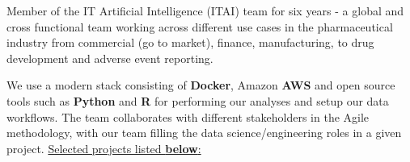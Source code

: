 
\vspace{2mm}

\begin{cvparagraph}

Member of the IT Artificial Intelligence (ITAI) team for six years - a global and cross functional team working across different use cases in the pharmaceutical industry from commercial (go to market), finance, manufacturing, to drug development and adverse event reporting. 

We use a modern stack consisting of \textbf{Docker}, Amazon \textbf{AWS} and open source tools such as \textbf{Python} and \textbf{R} for performing our analyses and setup our data workflows. The team collaborates with different stakeholders in the Agile methodology, with our team filling the data science/engineering roles in a given project. \underline{Selected projects listed \textbf{below}:}
\end{cvparagraph}

\vspace{2mm}

